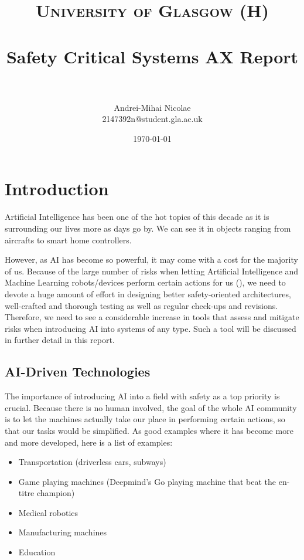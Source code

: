 \documentclass[paper=a4, fontsize=11pt]{scrartcl} %
\title{
\normalfont \normalsize
\textsc{University of Glasgow (H)} \\ [25pt] 
\horrule{0.5pt} \\[0.4cm] %
\huge Safety Critical Systems AX Report \\ 
\horrule{2pt} \\[0.5cm] %
}
\author{Andrei-Mihai Nicolae\\2147392n@student.gla.ac.uk} %
\date{\normalsize\today} %
\numberwithin{equation}{section} %
\numberwithin{figure}{section} %
\numberwithin{table}{section} %
\begin{document}
\maketitle %

\tableofcontents %


\section{Introduction}

\par
Artificial Intelligence has been one of the hot topics of this decade as it is surrounding our lives more as days go by. We can see it in objects ranging from aircrafts to smart home controllers.

However, as AI has become so powerful, it may come with a cost for the majority of us. Because of the large number of risks when letting Artificial Intelligence and Machine Learning robots/devices perform certain actions for us (\cite{ai-risks}), we need to devote a huge amount of effort in designing better safety-oriented architectures, well-crafted and thorough testing as well as regular check-ups and revisions. Therefore, we need to see a considerable increase in tools that assess and mitigate risks when introducing AI into systems of any type. Such a tool will be discussed in further detail in this report.


\subsection{AI-Driven Technologies}

\par
The importance of introducing AI into a field with safety as a top priority is crucial. Because there is no human involved, the goal of the whole AI community is to let the machines actually take our place in performing certain actions, so that our tasks would be simplified. As good examples where it has become more and more developed, here is a list of examples:

\begin{itemize}
	\item Transportation (driverless cars, subways)
	\item Game playing machines (Deepmind's Go playing machine that beat the en-titre champion) \citet{deepmind}
	\item Medical robotics
	\item Manufacturing machines
	\item Education
\end{itemize}
\end{document}
